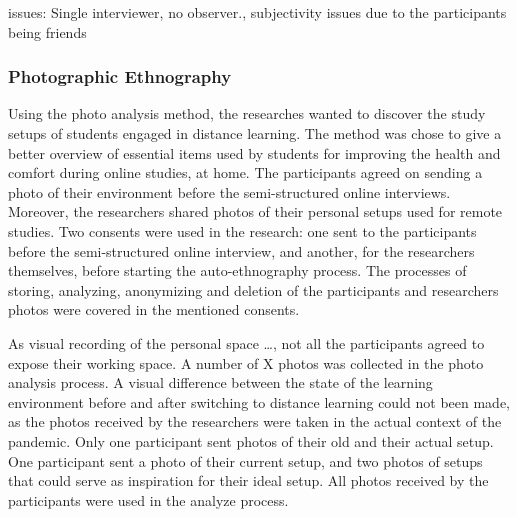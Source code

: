 \documentclass{sigchi}
\begin{document}
issues: Single interviewer, no observer., subjectivity issues due to the participants being friends

\subsubsection{Photographic Ethnography}
Using the photo analysis method, the researches wanted to discover the study setups of students engaged in distance learning. The method was chose to give a better overview of essential items used by students for improving the health and comfort during online studies, at home. The participants agreed on sending a photo of their environment before the semi-structured online interviews. Moreover, the researchers shared photos of their personal setups used for remote studies. Two consents were used in the research: one sent to the participants before the semi-structured online interview, and another, for the researchers themselves, before starting the auto-ethnography process. The processes of storing, analyzing, anonymizing and deletion of the participants and researchers photos were covered in the mentioned consents.

As visual recording of the personal space …, not all the participants agreed to expose their working space. A number of X photos was collected in the photo analysis process. A visual difference between the state of the learning environment before and after switching to distance learning could not been made, as the photos received by the researchers were taken in the actual context of the pandemic. Only one participant sent photos of their old and their actual setup.  One participant sent a photo of their current setup, and two photos of setups that could serve as inspiration for their ideal setup. All photos received by the participants were used in the analyze process.
\end{document}
